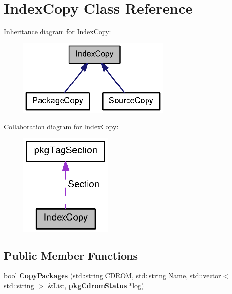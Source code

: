 \section{\-Index\-Copy \-Class \-Reference}
\label{classIndexCopy}


\-Inheritance diagram for \-Index\-Copy\-:
\nopagebreak
\begin{figure}[H]
\begin{center}
\leavevmode
\includegraphics[width=214pt]{classIndexCopy__inherit__graph}
\end{center}
\end{figure}


\-Collaboration diagram for \-Index\-Copy\-:
\nopagebreak
\begin{figure}[H]
\begin{center}
\leavevmode
\includegraphics[width=130pt]{classIndexCopy__coll__graph}
\end{center}
\end{figure}
\subsection*{\-Public \-Member \-Functions}
\begin{DoxyCompactItemize}
\item 
bool {\bfseries \-Copy\-Packages} (std\-::string \-C\-D\-R\-O\-M, std\-::string \-Name, std\-::vector$<$ std\-::string $>$ \&\-List, {\bf pkg\-Cdrom\-Status} $\ast$log)\label{classIndexCopy_a46aceab5dbcb523235780c3c39d83e7e}

\end{DoxyCompactItemize}
